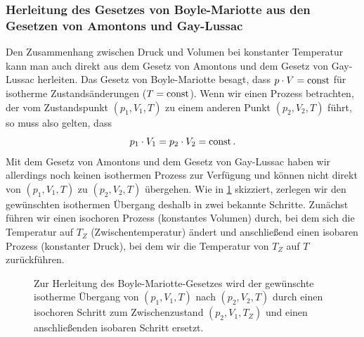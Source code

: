 \subsubsection{Herleitung des Gesetzes von Boyle-Mariotte aus den Gesetzen von Amontons und Gay-Lussac}
Den Zusammenhang zwischen Druck und Volumen bei konstanter Temperatur kann man auch direkt aus dem Gesetz von Amontons und dem Gesetz von Gay-Lussac herleiten. Das Gesetz von Boyle-Mariotte besagt, dass $p \cdot V = \mathrm{const}$ für isotherme Zustandsänderungen ($T = \mathrm{const}$). Wenn wir einen Prozess betrachten, der vom Zustandspunkt $(p_1, V_1, T)$ zu einem anderen Punkt $(p_2, V_2, T)$ führt, so muss also gelten, dass
\begin{equation}
    p_1 \cdot V_1 = p_2 \cdot V_2 = \mathrm{const} \,.    
\end{equation} 
Mit dem Gesetz von Amontons und dem Gesetz von Gay-Lussac haben wir allerdings noch keinen isothermen Prozess zur Verfügung und können nicht direkt von $(p_1, V_1, T)$ zu $(p_2, V_2, T)$ übergehen. Wie in \cref{fig: boyle_mariotte_herleitung_umweg} skizziert, zerlegen wir den gewünschten isothermen Übergang deshalb in zwei bekannte Schritte. Zunächst führen wir einen isochoren Prozess (konstantes Volumen) durch, bei dem sich die Temperatur auf $T_Z$ (Zwischentemperatur) ändert und anschließend einen isobaren Prozess (konstanter Druck), bei dem wir die Temperatur von $T_Z$ auf $T$ zurückführen.

\begin{figure}[tb]
    \centering
    \caption{Zur Herleitung des Boyle-Mariotte-Gesetzes wird der gewünschte isotherme Übergang von $(p_1, V_1, T)$ nach $(p_2, V_2, T)$ durch einen isochoren Schritt zum Zwischenzustand $(p_2, V_1, T_Z)$ und einen anschließenden isobaren Schritt ersetzt.}\label{fig: boyle_mariotte_herleitung_umweg}
\end{figure}

